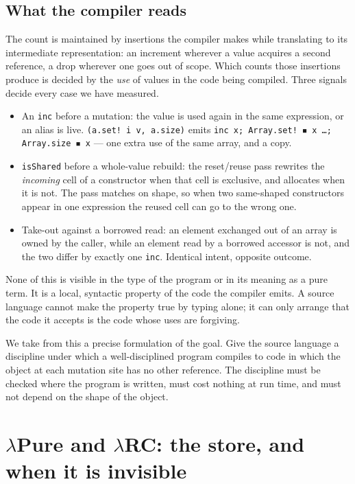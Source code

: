 \documentclass[11pt,a4paper]{article}
\theoremstyle{definition}
\theoremstyle{plain}
\newcommand{\lrc}{\textup{$\lambda$RC}}
\newcommand{\lpure}{\textup{$\lambda$Pure}}
\newcommand{\code}[1]{\texttt{#1}}
\begin{document}
\subsection{What the compiler reads}

The count is maintained by insertions the compiler makes while translating to
its intermediate representation: an increment wherever a value acquires a second
reference, a drop wherever one goes out of scope. Which counts those insertions
produce is decided by the \emph{use} of values in the code being compiled.
Three signals decide every case we have measured.

\begin{itemize}[leftmargin=1.4em,itemsep=2pt]
\item An \code{inc} before a mutation: the value is used again in the same
expression, or an alias is live. \code{(a.set! i v, a.size)} emits
\code{inc x; Array.set! ◾ x …; Array.size ◾ x} --- one extra use of the same
array, and a copy.
\item \code{isShared} before a whole-value rebuild: the reset/reuse pass rewrites
the \emph{incoming} cell of a constructor when that cell is exclusive, and
allocates when it is not. The pass matches on shape, so when two same-shaped
constructors appear in one expression the reused cell can go to the wrong one.
\item Take-out against a borrowed read: an element exchanged out of an array is
owned by the caller, while an element read by a borrowed accessor is not, and
the two differ by exactly one \code{inc}. Identical intent, opposite outcome.
\end{itemize}

None of this is visible in the type of the program or in its meaning as a pure
term. It is a local, syntactic property of the code the compiler emits. A source
language cannot make the property true by typing alone; it can only arrange that
the code it accepts is the code whose uses are forgiving.

We take from this a precise formulation of the goal. Give the source language a
discipline under which a well-disciplined program compiles to code in which the
object at each mutation site has no other reference. The discipline must be
checked where the program is written, must cost nothing at run time, and must
not depend on the shape of the object.

\section{\texorpdfstring{\lpure}{Pure} and \texorpdfstring{\lrc}{RC}: the store, and when it is invisible}\label{sec:lambda}
\end{document}
